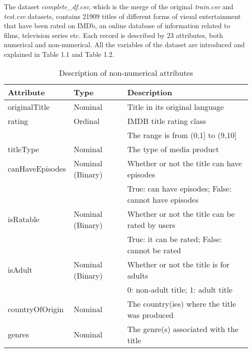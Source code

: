 % 


The dataset \textit{complete\_df.csv}, which is the merge of the original \textit{train.csv} and \textit{test.csv} datasets, contains 21909 titles of different forms of visual entertainment that have been rated on IMDb, an online database of information related to films, television series etc. 
Each record is described by 23 attributes, both numerical and non-numerical. 
All the variables of the dataset are introduced and explained in Table 1.1 and Table 1.2.
\begin{table}[h]
    \centering
    \begin{tabular}{|l|l|l|} %
        \hline
        \textbf{Attribute} & \textbf{Type} & \textbf{Description} \\ 
        \hline
        originalTitle & Nominal & Title in its original language \\  
        \hline
        rating & Ordinal & IMDB title rating class \\
        & & The range is from (0,1] to (9,10] \\ 
        \hline
        titleType & Nominal & The type of media product \\ 
        \hline
        canHaveEpisodes & Nominal (Binary) & Whether or not the title can have episodes \\ 
        & & True: can have episodes; False: cannot have episodes \\ 
        \hline
        isRatable & Nominal (Binary) & Whether or not the title can be rated by users \\ 
        & & True: it can be rated; False: cannot be rated \\ 
        \hline
        isAdult & Nominal (Binary) & Whether or not the title is for adults \\ 
        & & 0: non-adult title; 1: adult title \\ 
        \hline
        countryOfOrigin & Nominal & The country(ies) where the title was produced \\ 
        \hline
        genres & Nominal & The genre(s) associated with the title \\ 
        \hline
    \end{tabular}
    \caption{Description of non-numerical attributes}
    \label{tab:attributes}
\end{table}
